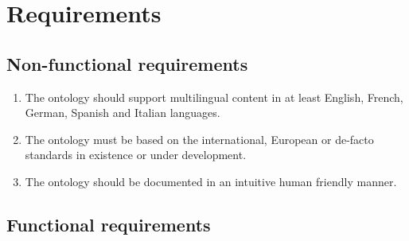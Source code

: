 \hypertarget{ariaid-title1}{%
\section{Requirements}\label{ariaid-title1}}

\hypertarget{non-functional-requirements}{%
\subsection{Non-functional
requirements}\label{non-functional-requirements}}

\begin{enumerate}
\tightlist
\item
  The ontology should support multilingual content in at least English,
  French, German, Spanish and Italian languages.
\item
  The ontology must be based on the international, European or de-facto
  standards in existence or under development.
\item
  The ontology should be documented in an intuitive human friendly
  manner.
\end{enumerate}

\hypertarget{functional-requirements}{%
\subsection{Functional requirements}\label{functional-requirements}}

